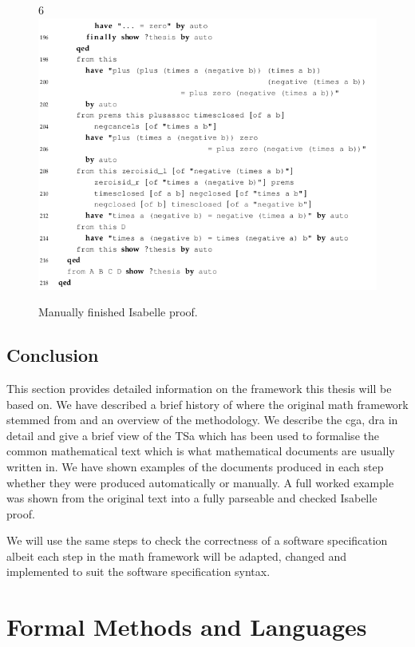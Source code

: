 \begin{figure}[H]
\begin{center}
6\includegraphics[scale=0.6]{Figures/Background/ringfull8.png}
\end{center}
\caption{Manually finished Isabelle proof. \label{fig:ringfull}}
\end{figure}

\subsection{Conclusion}

This section provides detailed information on the framework this thesis will be
based on. We have described a brief history of where the original \gls{math}
framework stemmed from and an overview of the methodology. We describe the
\gls{cga}, \gls{dra} in detail and give a brief view of the TSa which has been
used to formalise the common mathematical text which is what mathematical
documents are usually written in. We have shown examples of the documents
produced in each step whether they were produced automatically or manually. A
full worked example was shown from the original text into a fully parseable and
checked Isabelle proof.

We will use the same steps to check the correctness of a software specification
albeit each step in the \gls{math} framework will be adapted, changed and
implemented to suit the software specification syntax.


\section{Formal Methods and Languages}
\label{sec:formalmethodsandformallanguages}

